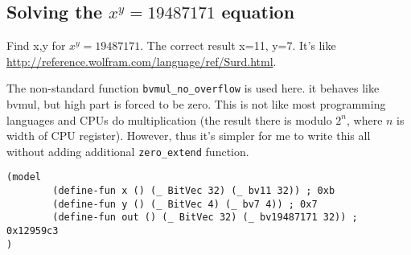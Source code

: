 \subsection{Solving the $x^y=19487171$ equation}

Find x,y for $x^y=19487171$.
The correct result x=11, y=7.
It's like \url{http://reference.wolfram.com/language/ref/Surd.html}.

The non-standard function \verb|bvmul_no_overflow| is used here. it behaves like bvmul, but high part is forced to be zero.
This is not like most programming languages and CPUs do multiplication
(the result there is modulo $2^n$, where $n$ is width of CPU register).
However, thus it's simpler for me to write this all without adding additional \verb|zero_extend| function.



\begin{lstlisting}[caption=The solution]
(model
        (define-fun x () (_ BitVec 32) (_ bv11 32)) ; 0xb
        (define-fun y () (_ BitVec 4) (_ bv7 4)) ; 0x7
        (define-fun out () (_ BitVec 32) (_ bv19487171 32)) ; 0x12959c3
)
\end{lstlisting}

